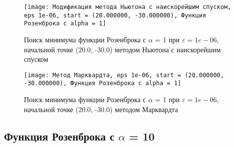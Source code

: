             \begin{figure}[H]
	        \centering
	        \texttt{[image: Модификация метода Ньютона с наискорейшим спуском, eps 1e-06, start = (20.000000, -30.000000), Функция Розенброка с alpha = 1]}%
	        \caption{Поиск минимума функции Розенброка с $\alpha$ = 1 при $\varepsilon = 1e-06$, начальной точке (20.0, -30.0) методом Ньютона с наискорейшим спуском}
	        \vspace*{-1.2cm}
            \end{figure}
            
            \begin{figure}[H]
	        \centering
	        \texttt{[image: Метод Марквардта, eps 1e-06, start = (20.000000, -30.000000), Функция Розенброка с alpha = 1]}%
	        \caption{Поиск минимума функции Розенброка с $\alpha$ = 1 при $\varepsilon = 1e-06$, начальной точке (20.0, -30.0) методом Марквардта}
	        \vspace*{-1.2cm}
            \end{figure}
            \subsection{Функция Розенброка с $\alpha$ = 10}

